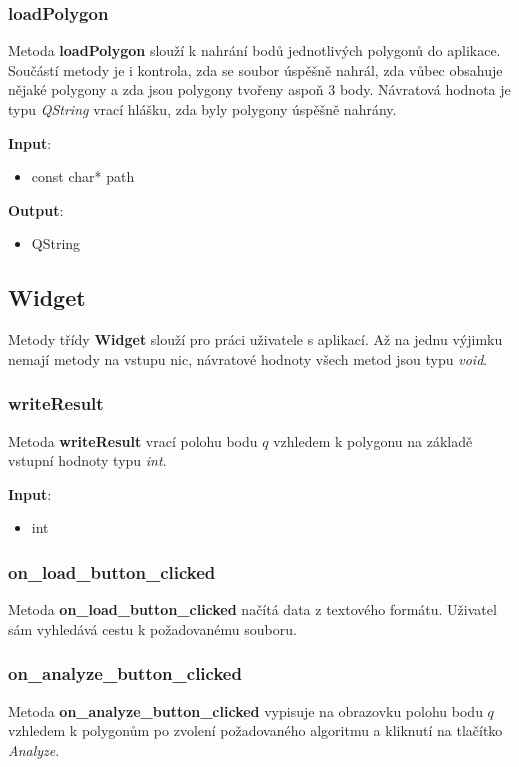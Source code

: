 \documentclass[a4paper, 12pt]{article}
\begin{document}
\subsubsection{loadPolygon}
Metoda \textbf{loadPolygon} slouží k nahrání bodů jednotlivých polygonů do aplikace.  Součástí metody je i kontrola, zda se soubor úspěšně nahrál, zda vůbec obsahuje nějaké polygony a zda jsou polygony tvořeny aspoň 3 body. Návratová hodnota je typu \textsl{QString} vrací hlášku, zda byly polygony úspěšně nahrány.

\textbf{Input}:
\begin{itemize}
\item const char* path
\end{itemize}

\textbf{Output}:
\begin{itemize}
\item QString
\end{itemize}

\subsection{Widget}
Metody třídy \textbf{Widget} slouží pro práci uživatele s aplikací. Až na jednu výjimku nemají metody na vstupu nic, návratové hodnoty všech metod jsou typu \textsl{void}.

\subsubsection{writeResult}
Metoda \textbf{writeResult} vrací polohu bodu $q$ vzhledem k polygonu na základě vstupní hodnoty typu \textit{int}.

\textbf{Input}:
\begin{itemize}
\item int
\end{itemize}

\subsubsection{on\_load\_button\_clicked}
Metoda \textbf{on\_load\_button\_clicked} načítá data z textového formátu. Uživatel sám vyhledává cestu k požadovanému souboru.

\subsubsection{on\_analyze\_button\_clicked}
Metoda \textbf{on\_analyze\_button\_clicked} vypisuje na obrazovku polohu bodu $q$ vzhledem k polygonům po zvolení požadovaného algoritmu a kliknutí na tlačítko \textsl{Analyze}.
\end{document}
